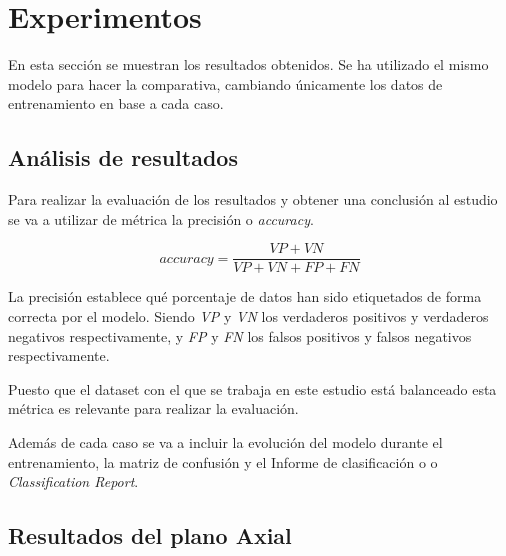 \section{Experimentos}\label{sec:experimentos}
En esta sección se muestran los resultados obtenidos.
Se ha utilizado el mismo modelo para hacer la comparativa, cambiando únicamente los datos de entrenamiento en base a
cada caso.

\subsection{Análisis de resultados}\label{subsec:analisis-de-resultados}
Para realizar la evaluación de los resultados y obtener una conclusión al estudio se va a utilizar de
métrica la precisión o \textit{accuracy}.

    \[accuracy=\frac{VP+VN}{VP+VN+FP+FN}\]

La precisión establece qué porcentaje de datos han sido etiquetados de forma correcta por el modelo.
Siendo \textit{VP} y \textit{VN} los verdaderos positivos y verdaderos negativos respectivamente,
y \textit{FP} y \textit{FN} los falsos positivos y falsos negativos respectivamente.

Puesto que el dataset con el que se trabaja en este estudio está balanceado esta métrica es relevante para realizar
la evaluación.

Además de cada caso se va a incluir la evolución del modelo durante el entrenamiento, la matriz de confusión y el
Informe de clasificación o o \textit{Classification Report}.


\subsection{Resultados del plano Axial}\label{subsec:resultados-del-plano-axial}

